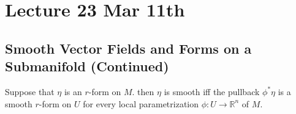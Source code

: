\documentclass[notoc,notitlepage]{tufte-book}
\begin{document}

\chapter{Lecture 23 Mar 11th}%
\label{chp:lecture_23_mar_11th}

\section{Smooth Vector Fields and Forms on a Submanifold (Continued)}%
\label{sec:smooth_vector_fields_and_forms_on_a_submanifold_continued}

\begin{lemma}\label{lemma:smoothness_of_pullbacks_and_forms}
  Suppose that $\eta$ is an $r$-form on $M$. then $\eta$ is smooth iff the
  pullback $\phi^* \eta$ is a smooth $r$-form on $U$ for every local
  parametrization $\phi : U \to \mathbb{R}^n$ of $M$.
\end{lemma}
\end{document}
